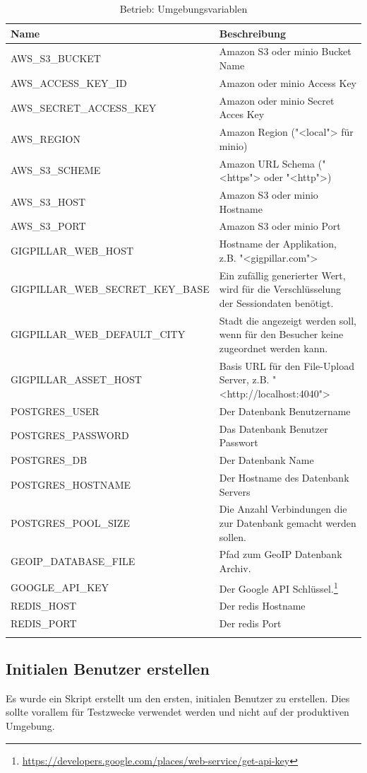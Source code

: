 \begin{longtable}[]{@{}lp{7cm}@{}}
  \toprule
  \textbf{Name}                     & \textbf{Beschreibung}\tabularnewline
  \midrule
  AWS\_S3\_BUCKET                   & Amazon S3 oder minio Bucket Name\tabularnewline
  AWS\_ACCESS\_KEY\_ID              & Amazon oder minio Access Key\tabularnewline
  AWS\_SECRET\_ACCESS\_KEY          & Amazon oder minio Secret Acces Key\tabularnewline
  AWS\_REGION                       & Amazon Region ("<local"> für minio)\tabularnewline
  AWS\_S3\_SCHEME                   & Amazon URL Schema ("<https"> oder "<http">)\tabularnewline
  AWS\_S3\_HOST                     & Amazon S3 oder minio Hostname\tabularnewline
  AWS\_S3\_PORT                     & Amazon S3 oder minio Port\tabularnewline
  GIGPILLAR\_WEB\_HOST              & Hostname der Applikation, z.B. "<gigpillar.com">\tabularnewline
  GIGPILLAR\_WEB\_SECRET\_KEY\_BASE & Ein zufällig generierter Wert, wird für die Verschlüsselung der Sessiondaten benötigt.\tabularnewline
  GIGPILLAR\_WEB\_DEFAULT\_CITY     & Stadt die angezeigt werden soll, wenn für den Besucher keine zugeordnet werden kann.\tabularnewline
  GIGPILLAR\_ASSET\_HOST            & Basis URL für den File-Upload Server, z.B. "<http://localhost:4040">\tabularnewline
  POSTGRES\_USER                    & Der Datenbank Benutzername\tabularnewline
  POSTGRES\_PASSWORD                & Das Datenbank Benutzer Passwort\tabularnewline
  POSTGRES\_DB                      & Der Datenbank Name\tabularnewline
  POSTGRES\_HOSTNAME                & Der Hostname des Datenbank Servers\tabularnewline
  POSTGRES\_POOL\_SIZE              & Die Anzahl Verbindungen die zur Datenbank gemacht werden sollen.\tabularnewline
  GEOIP\_DATABASE\_FILE             & Pfad zum GeoIP Datenbank Archiv.\tabularnewline
  GOOGLE\_API\_KEY                  & Der Google API Schlüssel.\footnote{\url{https://developers.google.com/places/web-service/get-api-key}}\tabularnewline
  REDIS\_HOST                       & Der redis Hostname \tabularnewline
  REDIS\_PORT                       & Der redis Port\tabularnewline
  \bottomrule
  \caption{Betrieb: Umgebungsvariablen}
\end{longtable}

\clearpage
\subsection{Initialen Benutzer erstellen}

Es wurde ein Skript erstellt um den ersten, initialen Benutzer zu erstellen.
Dies sollte vorallem für Testzwecke verwendet werden und nicht auf der
produktiven Umgebung.

